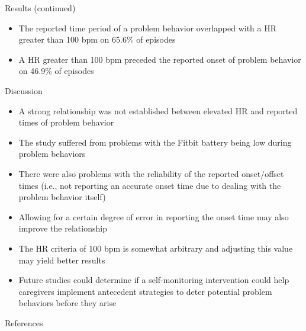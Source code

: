 \documentclass[final]{beamer}
\newlength{\onecolwid}
\begin{document}
\begin{frame}[t]
\begin{columns}[t]
\begin{column}{\onecolwid}
\begin{alertblock}{Results (continued)}
	\begin{itemize}
		\item The reported time period of a problem behavior overlapped with a HR greater than 100 bpm on 65.6\% of episodes
		\item A HR greater than 100 bpm preceded the reported onset of problem behavior on 46.9\% of episodes
		
	\end{itemize}
	
\end{alertblock}


\begin{alertblock}{Discussion}
	
	\begin{itemize}
		\item A strong relationship was not established between elevated HR and reported times of problem behavior
		\item The study suffered from problems with the Fitbit battery being low during problem behaviors
		\item There were also problems with the reliability of the reported onset/offset times (i.e., not reporting an accurate onset time due to dealing with the problem behavior itself)
		\item Allowing for a certain degree of error in reporting the onset time may also improve the relationship
		\item The HR criteria of 100 bpm is somewhat arbitrary and adjusting this value may yield better results
		\item Future studies could determine if a self-monitoring intervention could help caregivers implement antecedent strategies to deter potential problem behaviors before they arise
	\end{itemize}
	
\end{alertblock}



\begin{alertblock}{References}
	

\end{alertblock}
\end{column}
\end{columns}
\end{frame}
\end{document}
